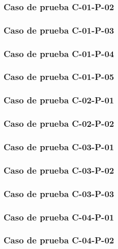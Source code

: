 \documentclass[10pt,a4paper]{article}
\begin{document}
			\subsubsection{Caso de prueba C-01-P-02}

			\subsubsection{Caso de prueba C-01-P-03}

			\subsubsection{Caso de prueba C-01-P-04}

			\subsubsection{Caso de prueba C-01-P-05}

			\subsubsection{Caso de prueba C-02-P-01}

			\subsubsection{Caso de prueba C-02-P-02}

			\subsubsection{Caso de prueba C-03-P-01}

			\subsubsection{Caso de prueba C-03-P-02}

			\subsubsection{Caso de prueba C-03-P-03}

			\subsubsection{Caso de prueba C-04-P-01}

			\subsubsection{Caso de prueba C-04-P-02}
\end{document}
